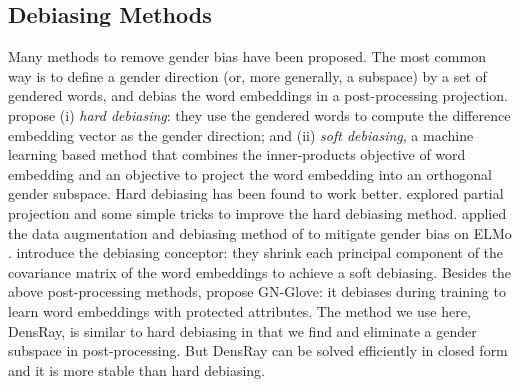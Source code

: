 \subsection{Debiasing Methods}
 Many methods to remove gender bias have been proposed. The
 most common way is to define a gender direction (or, more
 generally, a subspace) by a set of gendered words, and
 debias the word embeddings in a post-processing
 projection. \cite{bolukbasi2016man} propose (i) \emph{hard
   debiasing}: they use the gendered words to compute the
 difference embedding vector as the gender direction; and
 (ii) \emph{soft debiasing},
 a
 machine learning based method
that combines
 the inner-products objective of word embedding and an
 objective to project the word embedding into an orthogonal
 gender subspace. Hard debiasing has been found to work
 better. 
 \cite{dev2019attenuating} explored partial projection and
 some simple tricks to improve the hard debiasing
 method. \cite{zhao2019gender} applied the data
 augmentation and debiasing method of
 \cite{bolukbasi2016man} to mitigate gender bias on ELMo
 . \cite{karve2019conceptor} introduce
 the debiasing conceptor: they shrink each
 principal component of the covariance matrix of the word
 embeddings to achieve a soft debiasing. Besides the above
 post-processing methods,  propose
 GN-Glove: it debiases during training to learn word
 embeddings with protected attributes. The method we use
 here, DensRay, is similar to
hard debiasing in that we find
and eliminate a gender subspace in post-processing.
But DensRay can be solved efficiently in closed form and it
is more stable than hard debiasing.

 



